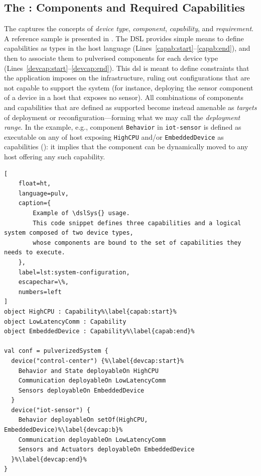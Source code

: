 \documentclass[conference]{IEEEtran}
\begin{document}
\subsection{The \dslSys{}: Components and Required Capabilities}
\label{sec:contrib:dslsys}

The \dslSys{} captures the concepts of
\emph{device type}, \emph{component}, \emph{capability}, and \emph{requirement}.
%
A reference sample is presented in .
%
The DSL provides simple means to define capabilities as types in the host language (Lines~\ref{capab:start}--\ref{capab:end}),
and then to associate them to pulverised components for each device type (Lines~\ref{devcap:start}--\ref{devcap:end}).
%
This \ac{dsl} is meant to define constraints that the application imposes on the infrastructure,
ruling out configurations that are not capable to support the system
(for instance, deploying the sensor component of a device in a host that exposes no sensor).
%
All combinations of components and capabilities that are defined as supported become instead amenable as \emph{targets} of deployment or reconfiguration---forming what we may call the \emph{deployment range}.
%
In the example, e.g., component \texttt{Behavior} in \texttt{iot-sensor} is defined as executable on any of host exposing
\texttt{HighCPU} and/or \texttt{EmbeddedDevice} as capabilities ():
it implies that the component can be dynamically moved to any host offering any such capability.

%

\begin{lstlisting}[
    float=ht,
    language=pulv,
    caption={
        Example of \dslSys{} usage.
        This code snippet defines three capabilities and a logical system composed of two device types,
        whose components are bound to the set of capabilities they needs to execute.
    },
    label=lst:system-configuration,
    escapechar=\%,
    numbers=left
]
object HighCPU : Capability%\label{capab:start}%
object LowLatencyComm : Capability
object EmbeddedDevice : Capability%\label{capab:end}%

val conf = pulverizedSystem {
  device("control-center") {%\label{devcap:start}%
    Behavior and State deployableOn HighCPU
    Communication deployableOn LowLatencyComm
    Sensors deployableOn EmbeddedDevice
  }
  device("iot-sensor") {
    Behavior deployableOn setOf(HighCPU, EmbeddedDevice)%\label{devcap:b}%
    Communication deployableOn LowLatencyComm
    Sensors and Actuators deployableOn EmbeddedDevice
  }%\label{devcap:end}%
}
\end{lstlisting}
\end{document}
